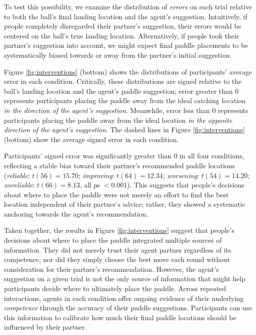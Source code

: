 \documentclass[10pt,letterpaper]{article}
\begin{document}
To test this possibility, we examine the distribution of \textit{errors} on each trial relative to both the ball's final landing location and the agent's suggestion. Intuitively, if people completely disregarded their partner's suggestion, their errors would be centered on the ball's true landing location. Alternatively, if people took their partner's suggestion into account, we might expect final paddle placements to be systematically biased towards or away from the partner's initial suggestion. 

Figure \ref{fig:interventions} (bottom) shows the distributions of participants' average error in each condition. Critically, these distributions are signed relative to the ball's landing location and the agent's paddle suggestion; error greater than 0 represents participants placing the paddle away from the ideal catching location \textit{in the direction of the agent's suggestion}. Meanwhile, error less than 0 represents participants placing the paddle away from the ideal location \textit{in the opposite direction of the agent's suggestion}. The dashed lines in Figure \ref{fig:interventions} (bottom) show the average signed error in each condition. 

Participants' signed error was significantly greater than $0$ in all four conditions, reflecting a stable bias toward their partner's recommended paddle locations (\textit{reliable}: $t(56) = 15.70$; \textit{improving}: $t(64) = 12.34$; \textit{worsening}: $t(54) = 14.20$; \textit{unreliable}: $t(66) = 8.13$, all $p$s $< 0.001$). This suggests that people's decisions about where to place the paddle were not merely an effort to find the best location independent of their partner's advice; rather, they showed a systematic anchoring towards the agent's recommendation.

Taken together, the results in Figure \ref{fig:interventions} suggest that people's decisions about where to place the paddle integrated multiple sources of information. They did not merely trust their agent partner regardless of its competence, nor did they simply choose the best move each round without consideration for their partner's recommendation. However, the agent's suggestion on a given trial is not the only source of information that might help participants decide where to ultimately place the paddle. Across repeated interactions, agents in each condition offer ongoing evidence of their underlying \textit{competence} through the accuracy of their paddle suggestions. Participants can use this information to calibrate how much their final paddle locations should be influenced by their partner. 
\end{document}
